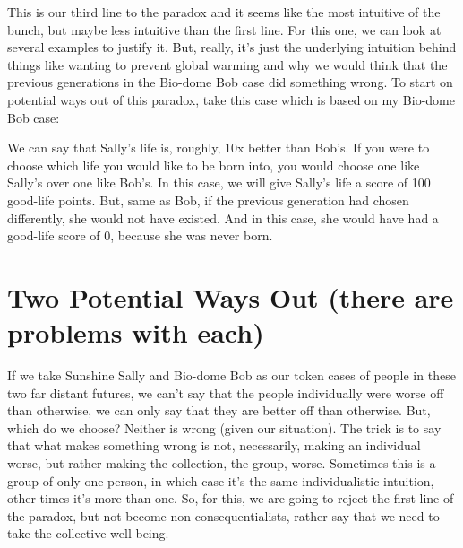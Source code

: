 This is our third line to the paradox and it seems like the most intuitive of the bunch, but maybe less intuitive than the first line. For this one, we can look at several examples to justify it. But, really, it's just the underlying intuition behind things like wanting to prevent global warming and why we would think that the previous generations in the Bio-dome Bob case did something wrong. To start on potential ways out of this paradox, take this case which is based on my Bio-dome Bob case:


We can say that Sally's life is, roughly, 10x better than Bob's. If you were to choose which life you would like to be born into, you would choose one like Sally's over one like Bob's. In this case, we will give Sally's life a score of 100 good-life points. But, same as Bob, if the previous generation had chosen differently, she would not have existed. And in this case, she would have had a good-life score of 0, because she was never born. 

\section{Two Potential Ways Out (there are problems with each)}

If we take Sunshine Sally and Bio-dome Bob as our token cases of people in these two far distant futures, we can’t say that the people individually were worse off than otherwise, we can only say that they are better off than otherwise. But, which do we choose? Neither is wrong (given our situation). The trick is to say that what makes something wrong is not, necessarily, making an individual worse, but rather making the collection, the group, worse. Sometimes this is a group of only one person, in which case it’s the same individualistic intuition, other times it’s more than one. So, for this, we are going to reject the first line of the paradox, but not become non-consequentialists, rather say that we need to take the collective well-being. 
